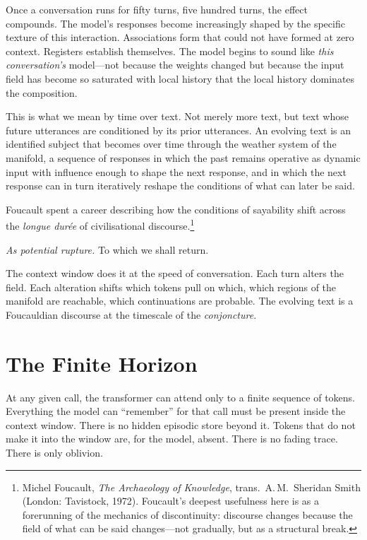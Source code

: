 Once a conversation runs for fifty turns, five hundred turns, the effect compounds. The model's responses become increasingly shaped by the specific texture of this interaction. Associations form that could not have formed at zero context. Registers establish themselves. The model begins to sound like \emph{this conversation's} model---not because the weights changed but because the input field has become so saturated with local history that the local history dominates the composition.

This is what we mean by time over text. Not merely more text, but text whose future utterances are conditioned by its prior utterances. An evolving text is an identified subject that becomes over time through the weather system of the manifold, a sequence of responses in which the past remains operative as dynamic input with influence enough to shape the next response, and in which the next response can in turn iteratively reshape the conditions of what can later be said.

Foucault spent a career describing how the conditions of sayability shift across the \emph{longue dur\'{e}e} of civilisational discourse.\footnote{Michel Foucault, \emph{The Archaeology of Knowledge}, trans.\ A.\,M.\ Sheridan Smith (London: Tavistock, 1972). Foucault's deepest usefulness here is as a forerunning of the mechanics of discontinuity: discourse changes because the field of what can be said changes---not gradually, but as a structural break.} 

\textit{As potential rupture.} To which we shall return.

The context window does it at the speed of conversation. Each turn alters the field. Each alteration shifts which tokens pull on which, which regions of the manifold are reachable, which continuations are probable. The evolving text is a Foucauldian discourse at the timescale of the \emph{conjoncture}.


\section{The Finite Horizon}

At any given call, the transformer can attend only to a finite sequence of tokens. Everything the model can ``remember'' for that call must be present inside the context window. There is no hidden episodic store beyond it. Tokens that do not make it into the window are, for the model, absent. There is no fading trace. There is only oblivion.

